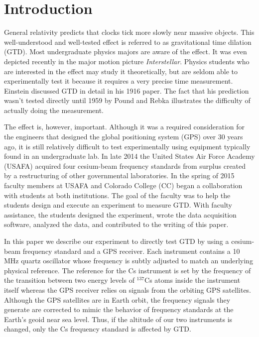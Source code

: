 \documentclass[prb,preprint]{revtex4-1}
\begin{document}
\section{Introduction} %
General relativity predicts that clocks tick more slowly near massive objects. This well-understood and well-tested effect is referred to as gravitational time dilation (GTD). Most undergraduate physics majors are aware of the effect. It was even depicted recently in the major motion picture \emph{Interstellar}. Physics students who are interested in the effect may study it theoretically, but are seldom able to experimentally test it because it requires a very precise time measurement. Einstein discussed GTD in detail in his 1916 paper.\cite{einstein1916} The fact that his prediction wasn't tested directly until 1959 by Pound and Rebka\cite{pound1959} illustrates the difficulty of actually doing the measurement. 

The effect is, however, important. Although it was a required consideration for the engineers that designed the global positioning system (GPS) over 30 years ago,\cite{ashby2002, ashby2003} it is still relatively difficult to test experimentally using equipment typically found in an undergraduate lab. In late 2014 the United States Air Force Academy (USAFA) acquired four cesium-beam frequency standards from surplus created by a restructuring of other governmental laboratories. In the spring of 2015 faculty members at USAFA and Colorado College (CC) began a collaboration with students at both institutions. The goal of the faculty was to help the students design and execute an experiment to measure GTD. With faculty assistance, the students designed the experiment, wrote the data acquisition software, analyzed the data, and contributed to the writing of this paper.

In this paper we describe our experiment to directly test GTD by using a cesium-beam frequency standard and a GPS receiver. Each instrument contains a 10 MHz quartz oscillator whose frequency is subtly adjusted to match an underlying physical reference. The reference for the Cs instrument is set by the frequency of the transition between two energy levels of $^{137}$Cs atoms inside the instrument itself whereas the GPS receiver relies on signals from the orbiting GPS satellites. Although the GPS satellites are in Earth orbit, the frequency signals they generate are corrected to mimic the behavior of frequency standards at the Earth's geoid near sea level. Thus, if the altitude of our two instruments is changed, only the Cs frequency standard is affected by GTD.
\end{document}
